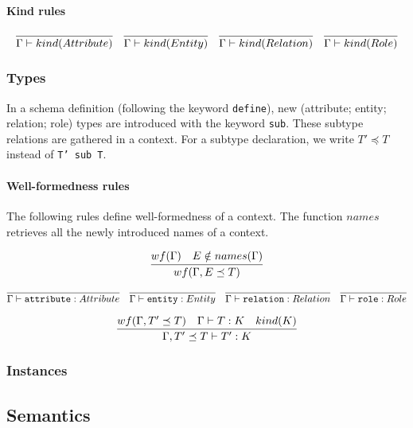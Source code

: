 \documentclass[runningheads]{llncs}
\begin{document}
\paragraph{Kind rules}


$$
\infer{\Gamma \vdash kind(Attribute)}{}
\quad
\infer{\Gamma \vdash kind(Entity)}{}
\quad
\infer{\Gamma \vdash kind(Relation)}{}
\quad
\infer{\Gamma \vdash kind(Role)}{}
$$



\subsubsection{Types}\label{sec:structure_types}

In a schema definition (following the keyword \texttt{define}), new
(attribute; entity; relation; role) types are introduced with the keyword
\texttt{sub}. These subtype relations are gathered in a context. For a subtype
declaration, we write $T' \preceq T$ instead of \texttt{T' sub T}.

\paragraph{Well-formedness rules} The following rules define well-formedness
of a context. The function $names$ retrieves all the newly introduced names of
a context.


$$
  \infer{wf(\Gamma, E \preceq T)}{
  wf(\Gamma) & E \notin names(\Gamma)
}
$$

$$
\infer{\Gamma \vdash \mathtt{attribute} : Attribute}{}
\quad
\infer{\Gamma \vdash \mathtt{entity} : Entity}{}
\quad
\infer{\Gamma \vdash \mathtt{relation} : Relation}{}
\quad
\infer{\Gamma \vdash \mathtt{role} : Role}{}
$$

$$
\infer{\Gamma, T' \preceq T \vdash T' : K}{
  wf(\Gamma, T' \preceq T) & \Gamma \vdash T : K & kind(K)
}
$$



\subsubsection{Instances}\label{sec:structure_instances}




\subsection{Semantics}
\end{document}
